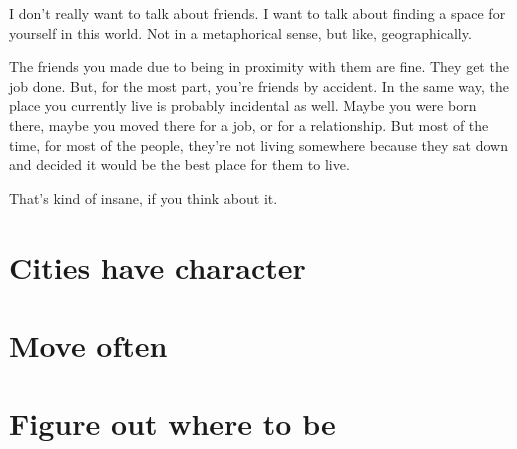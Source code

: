 \documentclass[../the-millions-of-gestures.tex]{subfiles}
\begin{document}
I don't really want to talk about friends. I want to talk about finding a space
for yourself in this world. Not in a metaphorical sense, but like,
geographically.

The friends you made due to being in proximity with them are fine. They get the
job done. But, for the most part, you're friends by accident. In the same way,
the place you currently live is probably incidental as well. Maybe you were born
there, maybe you moved there for a job, or for a relationship. But most of the
time, for most of the people, they're not living somewhere because they sat down
and decided it would be the best place for them to live.

That's kind of insane, if you think about it.

\section{Cities have character}
\TOWRITE

\section{Move often}
\section{Figure out where to be}
\end{document}
